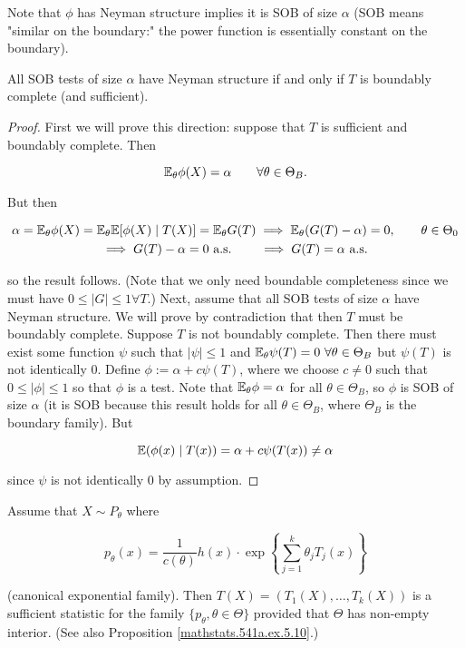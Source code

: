 Note that \(\phi\) has Neyman structure implies it is SOB of size \(\alpha\) (SOB means "similar on the boundary:" the power function is essentially constant on the boundary).

\begin{theorem}

All SOB tests of size \(\alpha\) have Neyman structure if and only if \(T\) is boundably complete (and sufficient).

\end{theorem}

\begin{proof}

First we will prove this direction: suppose that \(T\) is sufficient and boundably complete. Then

\[
\E_\theta \phi(X) = \alpha \qquad \forall \theta \in \Theta_B.
\]

But then 

\begin{multline*}
\alpha = \E_\theta \phi(X) = \E_\theta \E[\phi(X) \mid T(X)] = \E_\theta G(T)  \implies \E_\theta(G(T) - \alpha) = 0 , \qquad \theta \in \Theta_0
\\ \implies G(T) - \alpha = 0 \text{ a.s.}  \qquad \implies G(T) = \alpha \text { a.s.}
\end{multline*}

so the result follows. (Note that we only need boundable completeness since we must have \(0 \leq |G| \leq 1 \forall T\).) Next, assume that all SOB tests of size \(\alpha\) have Neyman structure. We will prove by contradiction that then \(T\) must be boundably complete. Suppose \(T\) is not boundably complete. Then there must exist some function \(\psi\) such that \(|\psi| \leq 1\) and \(\E_\theta \psi(T) = 0 \ \forall \theta \in \Theta_B\) but \(\psi(T)\) is not identically 0. Define \(\phi := \alpha + c \psi(T)\), where we choose \(c \neq 0 \) such that \( 0 \leq |\phi | \leq 1\) so that \(\phi\) is a test. Note that \(\E_\theta \phi = \alpha\) for all \(\theta \in \Theta_B\), so \(\phi\) is SOB of size \(\alpha\) (it is SOB because this result holds for all \(\theta \in \Theta_B\), where \(\Theta_B\) is the boundary family). But

\[
\E( \phi(x) \mid T(x) ) = \alpha + c \psi(T(x)) \neq \alpha
\]

since \(\psi\) is not identically 0 by assumption.

\end{proof}

\begin{theorem}\label{mathstats.541a.ex.5.10.thm}

Assume that \(X \sim P_\theta\) where 

\[
p_\theta(x) = \frac{1}{c(\theta)} h(x) \cdot \exp \left\{  \sum_{j=1}^k \theta_j T_j(x) \right\} 
\]

(canonical exponential family). Then \(T(X) = (T_1(X), \ldots, T_k(X))\) is a sufficient statistic for the family \(\{p_\theta, \theta \in \Theta\}\) provided that \(\Theta\) has non-empty interior. (See also Proposition \ref{mathstats.541a.ex.5.10}.)

\end{theorem}


